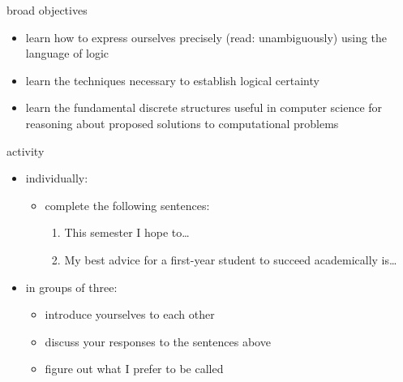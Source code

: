 \documentclass[10pt,t,usenames,dvipsnames]{beamer}
\begin{document}
  \begin{frame}{broad objectives}
    \begin{itemize}[itemsep=10pt]
      \item learn how to express ourselves precisely (read: unambiguously) using
        the language of logic
      \item learn the techniques necessary to establish logical certainty
      \item learn the fundamental discrete structures useful in computer science
        for reasoning about proposed solutions to computational problems
    \end{itemize}

  \end{frame}

  \begin{frame}[standout]{activity}
    \ifnotes
    \fi

    \begin{itemize}[itemsep=10pt]
      \item individually:
        \begin{itemize}[label=$\bullet$]
          \item complete the following sentences:
            \begin{enumerate}[label*=\arabic*.]
              \item This semester I hope to\dots
              \item My best advice for a first-year student to succeed
                academically is\dots
            \end{enumerate}
        \end{itemize}
      \item in groups of three:
        \begin{itemize}[label=$\bullet$]
          \item introduce yourselves to each other
          \item discuss your responses to the sentences above
          \item figure out what I prefer to be called
        \end{itemize}
    \end{itemize}

  \end{frame}
\end{document}
